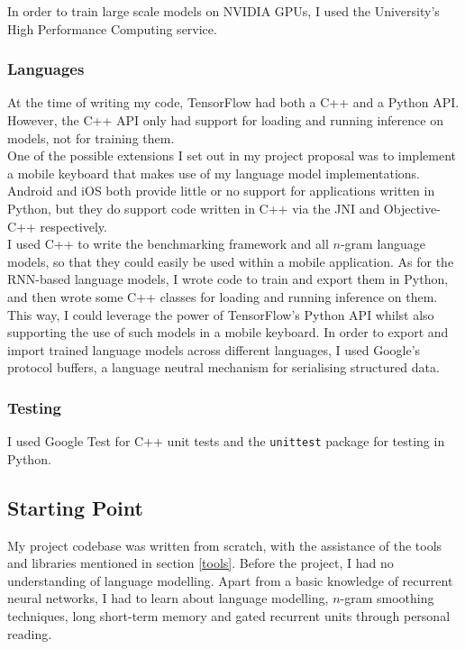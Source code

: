 \documentclass[a4paper, 12pt]{report}
\newcommand{\ttt}[1]{\texttt{#1}}
\begin{document}
In order to train large scale models on NVIDIA GPUs, I used the University's High Performance Computing service.

\subsubsection{Languages}

At the time of writing my code, TensorFlow had both a C++ and a Python API. However, the C++ API only had support for loading and running inference on models, not for training them. \\

One of the possible extensions I set out in my project proposal was to implement a mobile keyboard that makes use of my language model implementations. Android and iOS both provide little or no support for applications written in Python, but they do support code written in C++ via the JNI and Objective-C++ respectively. \\

I used C++ to write the benchmarking framework and all $n$-gram language models, so that they could easily be used within a mobile application. As for the RNN-based language models, I wrote code to train and export them in Python, and then wrote some C++ classes for loading and running inference on them. This way, I could leverage the power of TensorFlow's Python API whilst also supporting the use of such models in a mobile keyboard. In order to export and import trained language models across different languages, I used Google's protocol buffers, a language neutral mechanism for serialising structured data.

\subsubsection{Testing}

I used Google Test for C++ unit tests and the \ttt{unittest} package for testing in Python.

\subsection{Starting Point}

My project codebase was written from scratch, with the assistance of the tools and libraries mentioned in section \ref{tools}. Before the project, I had no understanding of language modelling. Apart from a basic knowledge of recurrent neural networks, I had to learn about language modelling, $n$-gram smoothing techniques, long short-term memory and gated recurrent units through personal reading. \\
\end{document}
